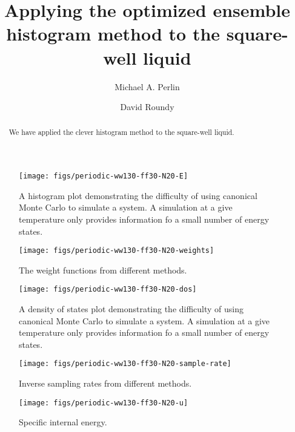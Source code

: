 \documentclass[letterpaper,twocolumn,amsmath,amssymb,pre,aps,10pt]{revtex4-1}
\begin{document}
\title{Applying the optimized ensemble histogram method to the
  square-well liquid}

\author{Michael A. Perlin} \author{David Roundy}

\begin{abstract}
  We have applied the clever histogram method to the square-well
  liquid.
\end{abstract}

\maketitle

\begin{figure}
  \texttt{[image: figs/periodic-ww130-ff30-N20-E]}
  \caption{A histogram plot demonstrating the difficulty of using
    canonical Monte Carlo to simulate a system.  A simulation at a
    give temperature only provides information fo a small number of
    energy states.\label{fig:histograms}}
\end{figure}

\begin{figure}
  \texttt{[image: figs/periodic-ww130-ff30-N20-weights]}
  \caption{The weight functions from different methods.}
\end{figure}

\begin{figure}
  \texttt{[image: figs/periodic-ww130-ff30-N20-dos]}
  \caption{A density of states plot demonstrating the difficulty of
    using canonical Monte Carlo to simulate a system.  A simulation at
    a give temperature only provides information fo a small number of
    energy states.\label{fig:dos}}
\end{figure}

\begin{figure}
  \texttt{[image: figs/periodic-ww130-ff30-N20-sample-rate]}
  \caption{Inverse sampling rates from different methods.}
\end{figure}


\begin{figure}
  \texttt{[image: figs/periodic-ww130-ff30-N20-u]}
  \caption{Specific internal energy.\label{fig:u}}
\end{figure}
\end{document}
